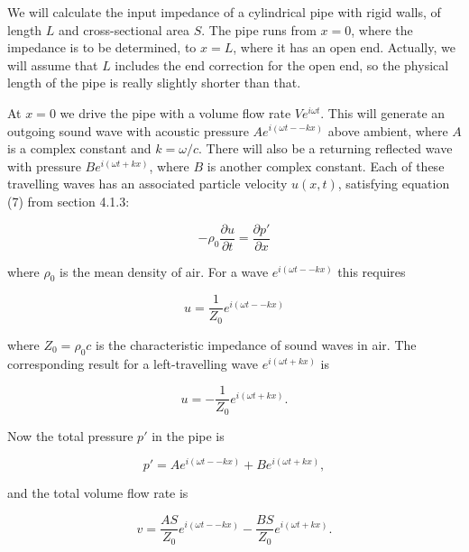   We will calculate the input impedance of a cylindrical pipe with rigid walls, 
  of length $L$ and cross-sectional area $S$. The pipe runs from $x=0$, where 
  the impedance is to be determined, to $x=L$, where it has an open end. 
  Actually, we will assume that $L$ includes the end correction for the open 
  end, so the physical length of the pipe is really slightly shorter than that. 

  At $x=0$ we drive the pipe with a volume flow rate $Ve^{i \omega t}$. This 
  will generate an outgoing sound wave with acoustic pressure $Ae^{i(\omega t 
  -- kx)}$ above ambient, where $A$ is a complex constant and $k=\omega/c$. 
  There will also be a returning reflected wave with pressure $Be^{i(\omega t + 
  kx)}$, where $B$ is another complex constant. Each of these travelling waves 
  has an associated particle velocity $u(x,t)$, satisfying equation (7) from 
  section 4.1.3: 

  \begin{equation*}-\rho_0 \dfrac{\partial u}{\partial t} = \dfrac{\partial 
  p'}{\partial x} \tag{1}\end{equation*} 

  \noindent{}where $\rho_0$ is the mean density of air. For a wave $e^{i(\omega 
  t -- kx)}$ this requires 

  \begin{equation*}u=\dfrac{1}{Z_0}e^{i(\omega t -- kx)} \tag{2}\end{equation*} 

  \noindent{}where $Z_0=\rho_0 c$ is the characteristic impedance of sound 
  waves in air. The corresponding result for a left-travelling wave 
  $e^{i(\omega t + kx)}$ is 

  \begin{equation*}u=-\dfrac{1}{Z_0}e^{i(\omega t + kx)} . 
  \tag{3}\end{equation*} 

  Now the total pressure $p'$ in the pipe is 

  \begin{equation*}p'=Ae^{i(\omega t -- kx)}+Be^{i(\omega t + kx)} , 
  \tag{4}\end{equation*} 

  \noindent{}and the total volume flow rate is 

  \begin{equation*}v=\dfrac{AS}{Z_0}e^{i(\omega t -- 
  kx)}-\dfrac{BS}{Z_0}e^{i(\omega t + kx)} . \tag{5}\end{equation*} 

